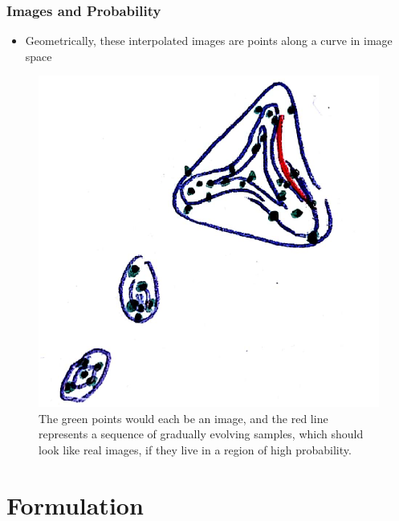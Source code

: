 \documentclass[10pt,mathserif]{beamer}
\begin{document}
\begin{frame}
  \frametitle{Images and Probability}
\begin{itemize}
  \item Geometrically, these interpolated images are points along a curve in
    image space
\end{itemize}
\begin{figure}[ht]
  \centering
  \includegraphics[width=0.3\paperwidth]{figure/gan_interpolations}
  \caption{The green points would each be an image, and the red line represents
    a sequence of gradually evolving samples, which should look like real
    images, if they live in a region of high probability.
    \label{fig:gan_interpolations_density} }
\end{figure}
\end{frame}

\section{Formulation}
\end{document}

